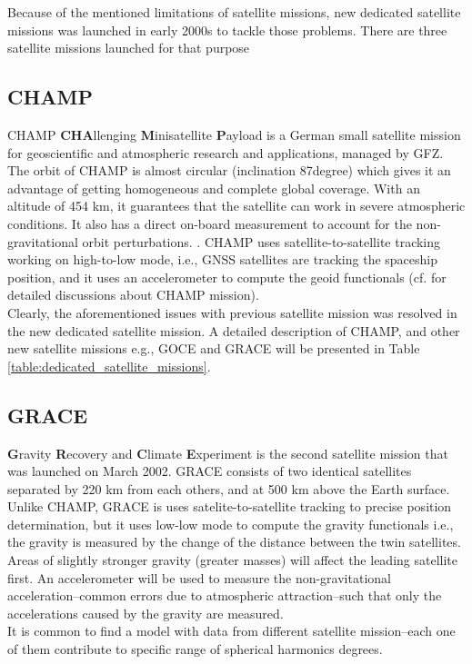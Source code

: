  Because of the mentioned limitations of satellite missions, new dedicated satellite missions was launched in early 2000s to tackle those problems. There are three satellite missions launched for that purpose
 \subsection{CHAMP}
 {CHAMP} \textbf{CHA}llenging \textbf{M}inisatellite \textbf{P}ayload \cite{champ} is a German small satellite mission for geoscientific and atmospheric research and applications, managed by GFZ. The orbit of CHAMP is almost circular (inclination 87\si{degree}) which gives it an advantage of getting homogeneous and complete global coverage. With an altitude of 454 km, it guarantees that the satellite can work in severe atmospheric conditions. It also has a direct on-board measurement to account for the non-gravitational orbit perturbations. . CHAMP uses satellite-to-satellite tracking working on high-to-low mode, i.e., GNSS satellites are tracking the spaceship position, and it uses an accelerometer to compute the geoid functionals (cf. \cite{luhr} for detailed discussions about CHAMP mission). 
 \\
 Clearly, the aforementioned issues with previous satellite mission was resolved in the new dedicated satellite mission. A detailed description of CHAMP, and other new satellite missions e.g., GOCE and GRACE will be presented in Table \ref{table:dedicated_satellite_missions}. 
 
 \subsection{GRACE}
 \textbf{G}ravity \textbf{R}ecovery and \textbf{C}limate \textbf{E}xperiment \cite{grace} is the second satellite mission that was launched on March 2002. GRACE consists of two identical satellites separated by 220 km from each others, and at 500 km above the Earth surface. Unlike CHAMP, GRACE is uses satelite-to-satellite tracking to precise position determination, but it uses low-low mode to compute the gravity functionals i.e., the gravity is measured by the change of the distance between the twin satellites. Areas of slightly stronger gravity (greater masses) will affect the leading satellite first. An accelerometer will be used to measure the non-gravitational acceleration--common errors due to atmospheric attraction--such that only the accelerations caused by the gravity are measured. 
 \\
 It is common to find a model with data from different satellite mission--each one of them contribute to specific range of spherical harmonics degrees.
 
